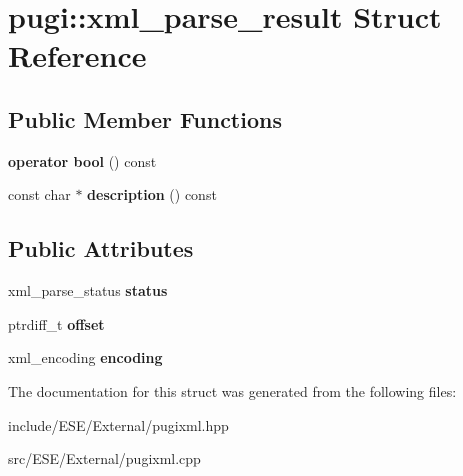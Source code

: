 \hypertarget{structpugi_1_1xml__parse__result}{\section{pugi\-:\-:xml\-\_\-parse\-\_\-result Struct Reference}
\label{structpugi_1_1xml__parse__result}
}
\subsection*{Public Member Functions}
\begin{DoxyCompactItemize}
\item 
\hypertarget{structpugi_1_1xml__parse__result_a1fd8f66dd233df5f76f63dea8627e589}{{\bfseries operator bool} () const }\label{structpugi_1_1xml__parse__result_a1fd8f66dd233df5f76f63dea8627e589}

\item 
\hypertarget{structpugi_1_1xml__parse__result_add183854c1798f4c8ae74f40def79b03}{const char $\ast$ {\bfseries description} () const }\label{structpugi_1_1xml__parse__result_add183854c1798f4c8ae74f40def79b03}

\end{DoxyCompactItemize}
\subsection*{Public Attributes}
\begin{DoxyCompactItemize}
\item 
\hypertarget{structpugi_1_1xml__parse__result_af8b3e6badea671931017695c8a9dd1af}{xml\-\_\-parse\-\_\-status {\bfseries status}}\label{structpugi_1_1xml__parse__result_af8b3e6badea671931017695c8a9dd1af}

\item 
\hypertarget{structpugi_1_1xml__parse__result_adb61df40459ba6fb1083d22467983086}{ptrdiff\-\_\-t {\bfseries offset}}\label{structpugi_1_1xml__parse__result_adb61df40459ba6fb1083d22467983086}

\item 
\hypertarget{structpugi_1_1xml__parse__result_ad11f279dfce644dfe297e24dc5f72c01}{xml\-\_\-encoding {\bfseries encoding}}\label{structpugi_1_1xml__parse__result_ad11f279dfce644dfe297e24dc5f72c01}

\end{DoxyCompactItemize}


The documentation for this struct was generated from the following files\-:\begin{DoxyCompactItemize}
\item 
include/\-E\-S\-E/\-External/pugixml.\-hpp\item 
src/\-E\-S\-E/\-External/pugixml.\-cpp\end{DoxyCompactItemize}
